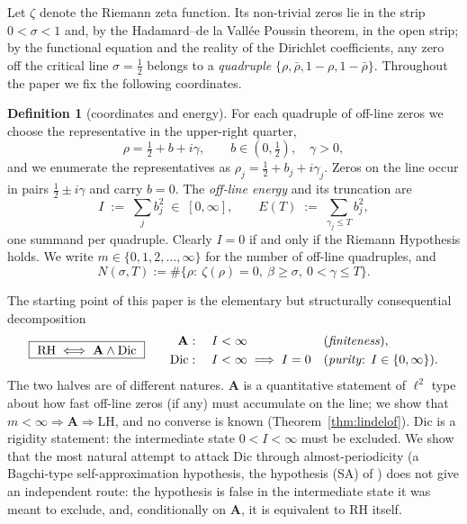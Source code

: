 \documentclass[11pt]{amsart}
\theoremstyle{plain}
\theoremstyle{definition}
\newtheorem{definition}[theorem]{Definition}
\theoremstyle{remark}
\newcommand{\RH}{\mathrm{RH}}
\newcommand{\LH}{\mathrm{LH}}
\newcommand{\Dic}{\mathrm{Dic}}
\newcommand{\Aax}{\mathbf{A}}
\begin{document}
Let $\zeta$ denote the Riemann zeta function. Its non-trivial zeros lie in the strip $0<\sigma<1$ and, by the Hadamard--de la Vall\'ee Poussin theorem, in the open strip; by the functional equation and the reality of the Dirichlet coefficients, any zero off the critical line $\sigma=\tfrac12$ belongs to a \emph{quadruple} $\{\rho,\bar\rho,1-\rho,1-\bar\rho\}$. Throughout the paper we fix the following coordinates.

\begin{definition}[coordinates and energy]\label{def:energy}
For each quadruple of off-line zeros we choose the representative in the upper-right quarter,
\[
\rho=\tfrac12+b+i\gamma,\qquad b\in(0,\tfrac12),\quad\gamma>0 ,
\]
and we enumerate the representatives as $\rho_j=\tfrac12+b_j+i\gamma_j$. Zeros on the line occur in pairs $\tfrac12\pm i\gamma$ and carry $b=0$. The \emph{off-line energy} and its truncation are
\[
I \;:=\; \sum_j b_j^2 \;\in\;[0,\infty],
\qquad
E(T)\;:=\;\sum_{\gamma_j\le T} b_j^2 ,
\]
one summand per quadruple. Clearly $I=0$ if and only if the Riemann Hypothesis holds. We write $m\in\{0,1,2,\dots,\infty\}$ for the number of off-line quadruples, and
\[
N(\sigma,T):=\#\{\rho:\ \zeta(\rho)=0,\ \beta\ge\sigma,\ 0<\gamma\le T\}.
\]
\end{definition}

The starting point of this paper is the elementary but structurally consequential decomposition
\begin{equation}\label{eq:decomposition}
\boxed{\ \RH \;\Longleftrightarrow\; \Aax\wedge\Dic\ }
\qquad
\begin{aligned}
\Aax&:\quad I<\infty &&\text{(\emph{finiteness})},\\
\Dic&:\quad I<\infty\;\Longrightarrow\;I=0 &&\text{(\emph{purity}: $I\in\{0,\infty\}$)}.
\end{aligned}
\end{equation}
The two halves are of different natures. $\Aax$ is a quantitative statement of $\ell^2$ type about how fast off-line zeros (if any) must accumulate on the line; we show that $m<\infty\Rightarrow\Aax\Rightarrow\LH$, and no converse is known (Theorem~\ref{thm:lindelof}). $\Dic$ is a rigidity statement: the intermediate state $0<I<\infty$ must be excluded. We show that the most natural attempt to attack $\Dic$ through almost-periodicity (a Bagchi-type self-approximation hypothesis, the hypothesis (SA) of \cite[Def.~2.1]{P30}) does not give an independent route: the hypothesis is false in the intermediate state it was meant to exclude, and, conditionally on $\Aax$, it is equivalent to $\RH$ itself.
\end{document}

